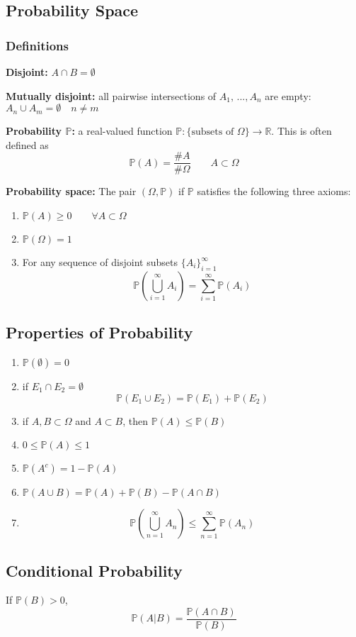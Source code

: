 \documentclass[12pt]{article}
\renewcommand{\P}{\mathbb{P}}
\newcommand{\R}{\mathbb{R}}
\begin{document}
\subsection{Probability Space}
\subsubsection*{Definitions}
\textbf{Disjoint:} $A \cap B = \emptyset$

\textbf{Mutually disjoint:} all pairwise intersections of $A_1, \, ..., A_n$ are empty: $A_n \cup A_m = \emptyset \quad n\neq m$ 

\textbf{Probability $\P$:} a real-valued function $\P : \{\text{subsets of } \Omega\} \to \R$. This is often defined as 
\[\P(A) = \frac{\#A}{\#\Omega} \qquad A \subset \Omega\]

\textbf{Probability space:} The pair $(\Omega, \P)$ if $\P$ satisfies the following three axioms:
\begin{enumerate}
    \item $\P(A) \geq 0 \qquad \forall A \subset \Omega$
    \item $\P(\Omega) = 1$
    \item For any sequence of disjoint subsets $\{A_i\}_{i=1}^\infty$
    \[\P\left(\bigcup_{i=1}^\infty A_i\right) = \sum_{i=1}^\infty \P(A_i)\]
\end{enumerate}

\subsection{Properties of Probability}
\begin{enumerate}
    \item $\P(\emptyset) = 0$
    \item if $E_1 \cap E_2 =\emptyset$
    \[\P(E_1 \cup E_2) = \P(E_1) + \P(E_2)\]
    \item if $A, B \subset \Omega$ and $A \subset B$, then $\P(A) \leq \P(B)$
    \item $0 \leq \P(A) \leq 1$
    \item $\P(A^c) = 1- \P(A)$
    \item $\P(A \cup B) = \P(A) + \P(B) - \P(A \cap B)$
    \item \[\P\left(\bigcup_{n=1}^\infty A_n\right) \leq \sum_{n=1}^\infty \P(A_n)\]
\end{enumerate}

\subsection{Conditional Probability}
If $\P(B) > 0$, 
\[\P(A | B) = \frac{\P(A \cap B)}{\P(B)}\]
\end{document}
